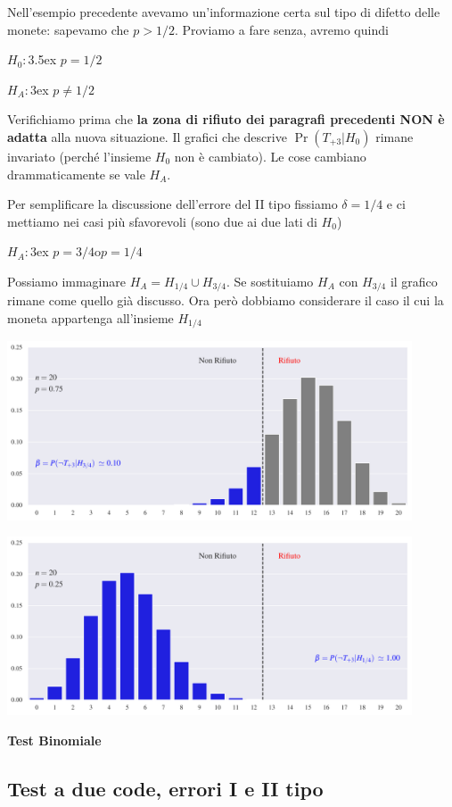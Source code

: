 \documentclass[11pt,openany]{book}
\begin{document}
Nell'esempio precedente avevamo un'informazione certa sul tipo di difetto delle monete: sapevamo che $p>1/2$. Proviamo a fare senza, avremo quindi

$H_0:$\kern3.5ex $p=1/2$

$H_A:$\kern3ex $p\neq1/2$

Verifichiamo prima che  \textbf{la zona di rifiuto dei paragrafi precedenti NON è adatta\/} alla nuova situazione. 
Il grafici che descrive $\Pr(T_{+3}|H_0)$ rimane invariato (perché l'insieme $H_0$ non è cambiato).
Le cose cambiano drammaticamente se vale $H_A$.

Per semplificare la discussione dell'errore del II tipo fissiamo $\delta=1/4$ e ci mettiamo nei casi più sfavorevoli (sono due ai due lati di $H_0$)

$H_A:$\kern3ex $p=3/4$\quad o\quad $p=1/4$ 

Possiamo immaginare $H_A=H_{{1/4}}\cup H_{{3/4}}$. 
Se sostituiamo $H_A$ con $H_{{3/4}}$ il grafico rimane come quello già discusso. 
Ora però dobbiamo considerare il caso il cui la moneta appartenga all'insieme $H_{{1/4}}$

\hfil\includegraphics[width=0.9\textwidth]{figure/B-test_02.pdf}

\hfil\includegraphics[width=0.9\textwidth]{figure/B-test_03.pdf}


\clearpage\hfill\textbf{Test Binomiale}\subsection{Test a due code, errori I e II tipo}
\end{document}
